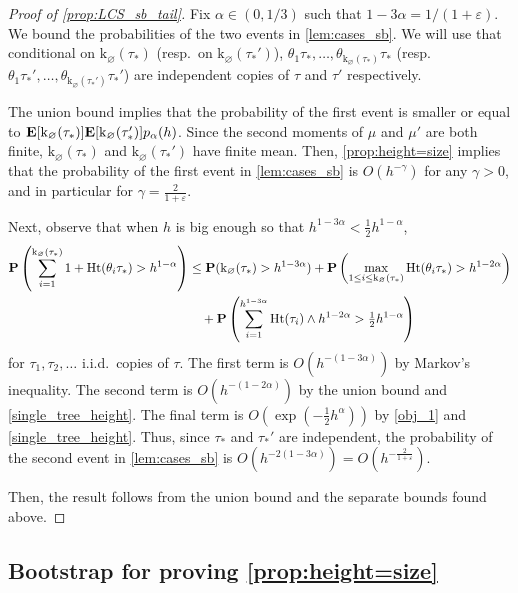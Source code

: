 \documentclass[11pt,reqno]{amsart}
\newcommand{\Ht}{\mathrm{Ht}}
\newcommand{\rk}{\mathrm{k}}
\newcommand{\eps}{\varepsilon}
\begin{document}
\begin{proof}[Proof of \cref{prop:LCS_sb_tail}]
Fix $\alpha\in (0,1/3)$ such that $1-3\alpha=1/(1+\eps)$. We bound the probabilities of the two events in \cref{lem:cases_sb}. We will use that conditional on $\rk_\varnothing(\tau_*)$ (resp.~on $\rk_\varnothing(\tau_*')$), $\theta_1\tau_*,\dots, \theta_{\rk_\varnothing(\tau_*)}\tau_*$ (resp.~$\theta_1\tau_*',\dots, \theta_{\rk_\varnothing(\tau_*')}\tau_*'$) are independent copies of $\tau$ and $\tau'$ respectively.

The union bound implies that the probability of the first event is smaller or equal to $\E[\rk_\varnothing(\tau_*)]\E[\rk_\varnothing(\tau_*')]p_\alpha(h)$. Since the second moments of $\mu$ and $\mu'$ are both finite, $\rk_\varnothing(\tau_*)$ and $\rk_\varnothing(\tau_*')$ have finite mean. Then, \cref{prop:height=size} implies that the probability of the first event in \cref{lem:cases_sb} is $O(h^{-\gamma})$ for any $\gamma>0$, and in particular for $\gamma=\tfrac{2}{1+\varepsilon}$.

Next, observe that when $h$ is big enough so that $h^{1-3\alpha}<\tfrac{1}{2}h^{1-\alpha}$,
\begin{align*}\prob\left(\sum_{i=1}^{\rk_\varnothing(\tau_*)}1+\Ht(\theta_i\tau_*)>h^{1-\alpha}\right)&\le \prob(\rk_\varnothing(\tau_*)>h^{1-3\alpha})+\prob\left(\max_{1\le i \le \rk_\varnothing(\tau_*)}\Ht(\theta_i\tau_*)>h^{1-2\alpha}\right)\\
&\quad +\prob\left(\sum_{i=1}^{h^{1-3\alpha}}\Ht(\tau_i)\wedge h^{1-2\alpha} >\tfrac{1}{2} h^{1-\alpha}\right)
\end{align*}
for $\tau_1,\tau_2,\dots$ i.i.d.\ copies of $\tau$.
The first term is $O(h^{-(1-3\alpha)})$ by Markov's inequality. The second term is $O(h^{-(1-2\alpha)})$ by the union bound and \cref{single_tree_height}. The final term is $O(\exp(-\tfrac{1}{2}h^\alpha))$ by \cref{obj_1} and \cref{single_tree_height}. Thus, since $\tau_*$ and $\tau_*'$ are independent, the probability of the second event in \cref{lem:cases_sb} is $O(h^{-2(1-3\alpha)})=O(h^{-\frac{2}{1+\varepsilon}})$. 

Then, the result follows from the union bound and the separate bounds found above. 
\end{proof}



\subsection{Bootstrap for proving \cref{prop:height=size}}
\end{document}

